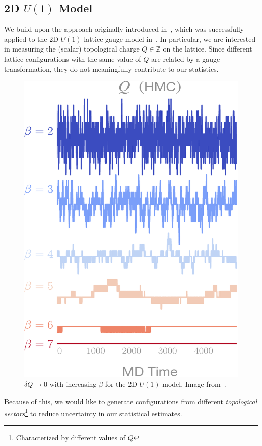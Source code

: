 \documentclass[a4paper,11pt]{article}
\begin{document}
\subsection{\label{subsec:2dU1}2D \texorpdfstring{$U(1)$}{U(1)} Model}
%
We build upon the approach originally introduced in~\cite{levy_generalizing_2018}, which was successfully applied to the 2D $U(1)$ lattice gauge model in~\cite{foreman_learning_2019,foreman_deep_2021,foreman_leapfroglayers_2022}.
%
In particular, we are interested in measuring the (scalar) topological charge
$Q \in \mathbb{Z}$ on the lattice.
%
Since different lattice configurations with the same value of $Q$ are related
by a gauge transformation, they do not meaningfully contribute to our
statistics.
%
\begin{figure}
  \begin{center}
  \caption{\label{fig:csd}$\delta Q \rightarrow 0$ with increasing $\beta$ for the 2D $U(1)$ model. Image from~\cite{foreman_leapfroglayers_2022}.}
  \includegraphics[width=\linewidth]{assets/csd1}
  \end{center}
\end{figure}
%
Because of this, we would like to generate configurations from different
\textit{topological sectors}\footnote{Characterized by different values of $Q$}
to reduce uncertainty in our statistical estimates.
\end{document}
